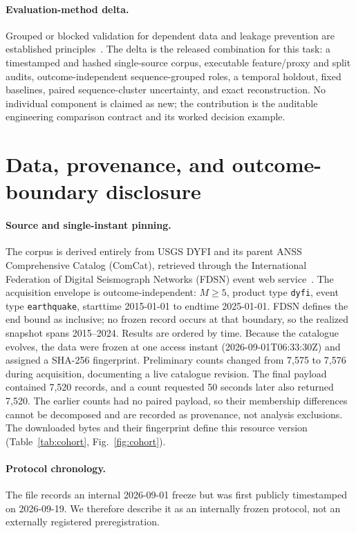 \documentclass[pdflatex,sn-basic,Numbered]{sn-jnl}
\begin{document}
\paragraph{Evaluation-method delta.}
Grouped or blocked validation for dependent data and leakage prevention are
established principles~\citep{roberts2017cv,kaufman2012leakage}. The delta is
the released combination for this task: a timestamped and hashed single-source
corpus, executable feature/proxy and split audits, outcome-independent
sequence-grouped roles, a temporal holdout, fixed baselines, paired
sequence-cluster uncertainty, and exact reconstruction. No individual component
is claimed as new; the contribution is the auditable engineering comparison
contract and its worked decision example.

\section{Data, provenance, and outcome-boundary disclosure}\label{sec:data}

\paragraph{Source and single-instant pinning.} The corpus is derived entirely
from USGS DYFI and its parent ANSS Comprehensive Catalog (ComCat), retrieved
through the International Federation of Digital Seismograph Networks (FDSN)
event web service~\citep{usgs_dyfi_data,usgs_comcat}. The
acquisition envelope is outcome-independent: $M\geq5$, product type
\texttt{dyfi}, event type \texttt{earthquake}, starttime 2015-01-01 to endtime
2025-01-01. FDSN defines the end bound as inclusive; no frozen record occurs
at that boundary, so the realized snapshot spans 2015--2024. Results are ordered
by time. Because the catalogue evolves, the data were frozen at one access
instant (2026-09-01T06:33:30Z) and assigned a SHA-256 fingerprint. Preliminary
counts changed from 7{,}575 to 7{,}576 during acquisition, documenting a live
catalogue revision. The final payload contained 7{,}520 records, and a count
requested 50 seconds later also returned 7{,}520. The earlier counts had no
paired payload, so their membership differences cannot be decomposed and are
recorded as provenance, not analysis exclusions. The downloaded bytes and their
fingerprint define this resource version
(Table~\ref{tab:cohort}, Fig.~\ref{fig:cohort}).

\paragraph{Protocol chronology.} The file records an internal 2026-09-01 freeze
but was first publicly timestamped on 2026-09-19. We therefore describe it as an
internally frozen protocol, not an externally registered preregistration.
\end{document}
